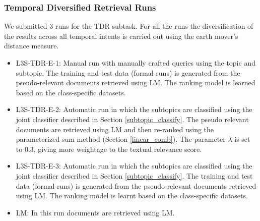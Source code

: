 \documentclass{sig-alternate}
\begin{document}
\subsubsection{Temporal Diversified Retrieval Runs}
We submitted 3 runs for the TDR subtask. For all the runs the diversification of the results across all temporal intents is carried out using the earth mover's distance measure.
\begin{itemize}
\item \textsf{L3S-TDR-E-1}: Manual run with manually crafted queries using the topic and subtopic. The training and test data (formal runs) is generated from the pseudo-relevant documents retrieved using LM. The ranking model is learned based on the class-specific datasets.
\item \textsf{L3S-TDR-E-2}: Automatic run in which the subtopics are classified using the joint classifier described in Section \ref{subtopic_classify}. The pseudo relevant documents are retrieved using LM and then re-ranked using the parameterized sum method (Section \ref{linear_comb}). The parameter $\lambda$ is set to 0.3, giving more weightage to the textual relevance score.
\item \textsf{L3S-TDR-E-3}: Automatic run in which the subtopics are classified using the joint classifier described in Section \ref{subtopic_classify}. The training and test data (formal runs) is generated from the pseudo-relevant documents retrieved using LM. The ranking model is learnt based on the class-specific datasets.
\item \textsf{LM}: In this run documents are retrieved using LM.
\end{itemize}
\end{document}
